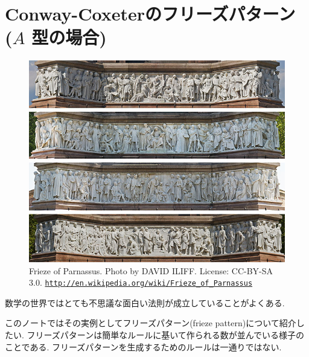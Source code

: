 \documentclass[12pt,twoside,dvipdfm]{jarticle}
\theoremstyle{definition} %
\theoremstyle{definition} %
\theoremstyle{definition} %
\numberwithin{theorem}{section}
\numberwithin{equation}{section}
\numberwithin{figure}{section}
\numberwithin{table}{section}
\begin{document}
\title{\TITLE}
\author{\AUTHOR}
\date{\DATE}
\maketitle
\tableofcontents

\section{Conway-Coxeterのフリーズパターン ($A$ 型の場合)}

\begin{figure}[ht]%
\begin{center}
\includegraphics[width=14cm]{610px-Albert_Memorial_Friese_Collage_-_May_2008-edit1.jpg}
\caption{Frieze of Parnassus.
Photo by DAVID ILIFF. License: CC-BY-SA 3.0. \newline
\href{http://en.wikipedia.org/wiki/Frieze_of_Parnassus}
{\tt http://en.wikipedia.org/wiki/Frieze\_of\_Parnassus}
}
\label{fig:frieze1}
\end{center}
\end{figure}

数学の世界ではとても不思議な面白い法則が成立していることがよくある.

このノートではその実例としてフリーズパターン(frieze pattern)について紹介したい.
フリーズパターンは簡単なルールに基いて作られる数が並んでいる様子のことである.
フリーズパターンを生成するためのルールは一通りではない.
\end{document}
